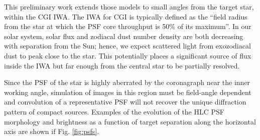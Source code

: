 \documentclass[]{spie}  %
\begin{document}
This preliminary work extends those models to small angles from the target star, within the \gls{CGI} \gls{IWA}.
The \gls{IWA} for CGI is typically defined as the ``field radius from the star at which the PSF core throughput is 50\% of its maximum''\cite{krist_numerical_2015}.
In our solar system, solar flux and zodiacal dust number density are both decreasing with separation from the Sun\cite{rowan-robinson_improved_2013,kennedy_exo-zodi_2014}; hence, we expect scattered light from exozodiacal dust to peak close to the star. This potentially places a significant source of flux inside the \gls{IWA} but far enough from the central star to be partially resolved.

Since the \gls{PSF} of the star is highly aberrated by the coronagraph near the inner working angle, simulation of images in this region must be field-angle dependent and  convolution of a representative \gls{PSF} will not recover the unique diffraction pattern of compact sources. 
Examples of the evolution of the \gls{HLC} PSF morphology and brightness as a function of target separation along the horizontal axis are shown if Fig. \ref{fig:psfs}.
\end{document}
